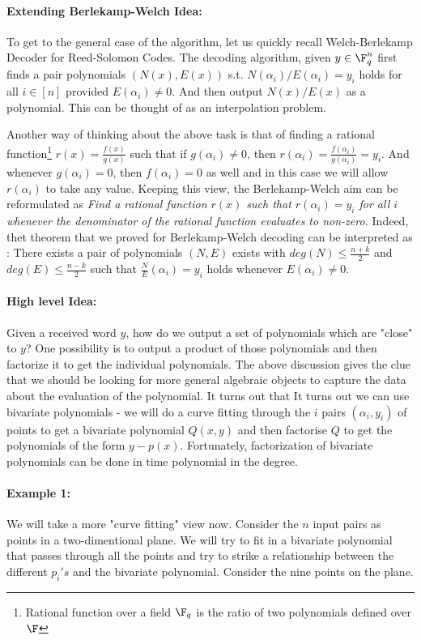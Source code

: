 \paragraph{Extending Berlekamp-Welch Idea:} To get to the general case of the algorithm, let us quickly recall Welch-Berlekamp Decoder for Reed-Solomon Codes. The decoding algorithm, given $y \in \F_q^n$ first finds a pair polynomials $(N(x),E(x))$ s.t. $N(\alpha_i)/E(\alpha_i) = y_i$ holds for all $i \in [n]$ provided $E(\alpha_i) \ne 0$. And then output $N(x)/E(x)$ as a polynomial. This can be thought of as an interpolation problem.

Another way of thinking about the above task is that of finding a rational function\footnote{Rational function over a field $\F_q$ is the ratio of two polynomials defined over $\F$} $r(x) = \frac{f(x)}{g(x)}$ such that if $g(\alpha_i) \ne 0$, then $r(\alpha_i) = \frac{f(\alpha_i)}{g(\alpha_i)} = y_i$. And 
whenever $g(\alpha_i) = 0$, then $f(\alpha_i)=0$ as well and in this case we will allow $r(\alpha_i)$ to take any value. Keeping this view, the Berlekamp-Welch aim can be reformulated as {\em Find a rational function $r(x)$ such that $r(\alpha_i) = y_i$ for all $i$ whenever the denominator of the rational function evaluates to non-zero.} Indeed, thet theorem that we proved for Berlekamp-Welch decoding can be interpreted as : There exists a pair of polynomials $(N,E)$ exists with $deg(N) \le \frac{n+k}{2}$ and $deg(E) \le \frac{n-k}{2}$ such that $\frac{N}{E}(\alpha_i) = y_i$ holds whenever $E(\alpha_i) \ne 0$.
\vspace{-4mm}
\paragraph{\bf High level Idea:} 
Given a received word $y$, how do we output a set of polynomials which are "close" to $y$? One possibility is to output a product of those polynomials and then factorize it to get the individual polynomials. The above discussion gives the clue that we should be looking for more general algebraic objects to capture the data about the  evaluation of the polynomial. It turns out that 
It turns out we can use bivariate polynomials - we will do a curve fitting through the $i$ pairs $(\alpha_i,y_i)$ of points to get a bivariate polynomial $Q(x,y)$ and then factorise $Q$ to get the polynomials of the form $y-p(x)$. Fortunately, factorization of bivariate polynomials can be done in time polynomial in the degree.
\vspace{-4mm}
\paragraph{Example 1:}
We will take a more "curve fitting" view now. Consider the $n$ input pairs as points in a two-dimentional plane. We will try to fit in a bivariate polynomial that passes through all the points and try to strike a relationship between the different $p_i's$ and the bivariate polynomial. Consider the nine points on the plane.\\[-2mm]

